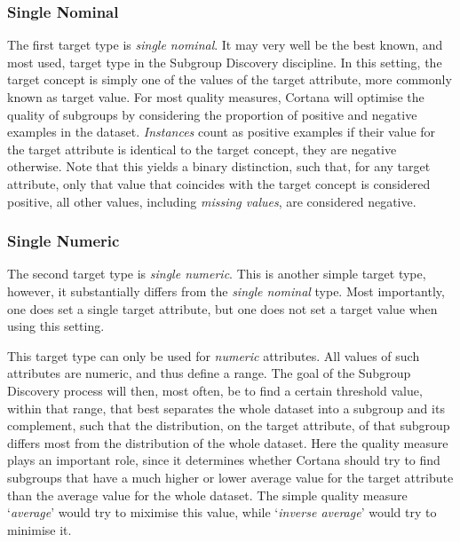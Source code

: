 \documentclass{article}
\begin{document}
\subsubsection{Single Nominal}
The first target type is \emph{single nominal}.
It may very well be the best known, and most used, target type in the Subgroup Discovery discipline.
In this setting, the target concept is simply one of the values of the target attribute, more commonly known as target value.
For most quality measures, Cortana will optimise the quality of subgroups by considering the proportion of positive and negative examples in the dataset.
\emph{Instances} count as positive examples if their value for the target attribute is identical to the target concept, they are negative otherwise.
Note that this yields a binary distinction, such that, for any target attribute, only that value that coincides with the target concept is considered positive, all other values, including \emph{missing values}, are considered negative.

\subsubsection{Single Numeric}
The second target type is \emph{single numeric}.
This is another simple target type, however, it substantially differs from the \emph{single nominal} type.
Most importantly, one does set a single target attribute, but one does not set a target value when using this setting.

This target type can only be used for \emph{numeric} attributes.
All values of such attributes are numeric, and thus define a range.
The goal of the Subgroup Discovery process will then, most often, be to find a certain threshold value, within that range, that best separates the whole dataset into a subgroup and its complement, such that the distribution, on the target attribute, of that subgroup differs most from the distribution of the whole dataset.
Here the quality measure plays an important role, since it determines whether Cortana should try to find subgroups that have a much higher or lower average value for the target attribute than the average value for the whole dataset.
The simple quality measure `\emph{average}'  would try to miximise this value, while `\emph{inverse average}' would try to minimise it.
\end{document}
